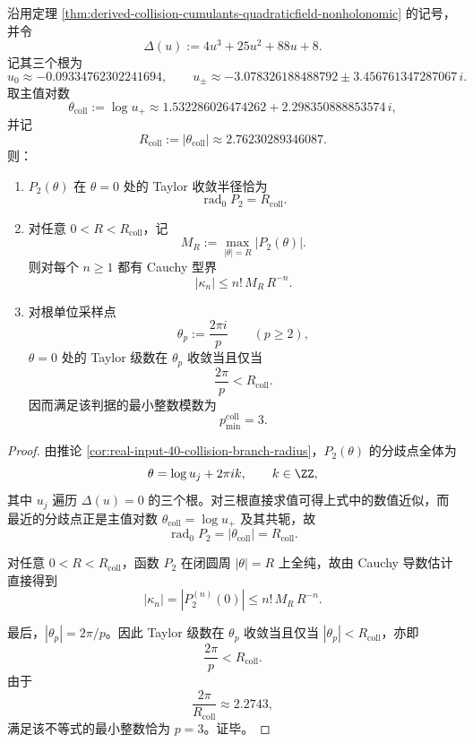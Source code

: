 \begin{corollary}\label{cor:derived-collision-cumulants-radius-cauchy-rootunity}
沿用定理 \ref{thm:derived-collision-cumulants-quadraticfield-nonholonomic} 的记号，并令
\[
\Delta(u):=4u^3+25u^2+88u+8.
\]
记其三个根为
\[
u_0\approx -0.09334762302241694,
\qquad
u_\pm\approx -3.078326188488792 \pm 3.456761347287067\,i.
\]
取主值对数
\[
\theta_{\mathrm{coll}}:=\log u_+
\approx 1.532286026474262 + 2.298350888853574\,i,
\]
并记
\[
R_{\mathrm{coll}}:=|\theta_{\mathrm{coll}}|
\approx 2.76230289346087.
\]
则：
\begin{enumerate}
  \item \(P_2(\theta)\) 在 \(\theta=0\) 处的 Taylor 收敛半径恰为
  \[
  \operatorname{rad}_0 P_2=R_{\mathrm{coll}}.
  \]
  \item 对任意 \(0<R<R_{\mathrm{coll}}\)，记
  \[
  M_R:=\max_{|\theta|=R}|P_2(\theta)|.
  \]
  则对每个 \(n\ge 1\) 都有 Cauchy 型界
  \[
  |\kappa_n|\le n!\,M_R\,R^{-n}.
  \]
  \item 对根单位采样点
  \[
  \theta_p:=\frac{2\pi i}{p}\qquad(p\ge 2),
  \]
  \(\theta=0\) 处的 Taylor 级数在 \(\theta_p\) 收敛当且仅当
  \[
  \frac{2\pi}{p}<R_{\mathrm{coll}}.
  \]
  因而满足该判据的最小整数模数为
  \[
  p_{\min}^{\mathrm{coll}}=3.
  \]
\end{enumerate}
\end{corollary}
\begin{proof}
由推论 \ref{cor:real-input-40-collision-branch-radius}，\(P_2(\theta)\) 的分歧点全体为
\[
\theta=\log u_j+2\pi i k,
\qquad
k\in\ZZ,
\]
其中 \(u_j\) 遍历 \(\Delta(u)=0\) 的三个根。对三根直接求值可得上式中的数值近似，而最近的分歧点正是主值对数 \(\theta_{\mathrm{coll}}=\log u_+\) 及其共轭，故
\[
\operatorname{rad}_0 P_2=|\theta_{\mathrm{coll}}|=R_{\mathrm{coll}}.
\]

对任意 \(0<R<R_{\mathrm{coll}}\)，函数 \(P_2\) 在闭圆周 \(|\theta|=R\) 上全纯，故由 Cauchy 导数估计直接得到
\[
|\kappa_n|=|P_2^{(n)}(0)|\le n!\,M_R\,R^{-n}.
\]

最后，\(|\theta_p|=2\pi/p\)。因此 Taylor 级数在 \(\theta_p\) 收敛当且仅当 \(|\theta_p|<R_{\mathrm{coll}}\)，亦即
\[
\frac{2\pi}{p}<R_{\mathrm{coll}}.
\]
由于
\[
\frac{2\pi}{R_{\mathrm{coll}}}\approx 2.2743,
\]
满足该不等式的最小整数恰为 \(p=3\)。证毕。
\end{proof}

